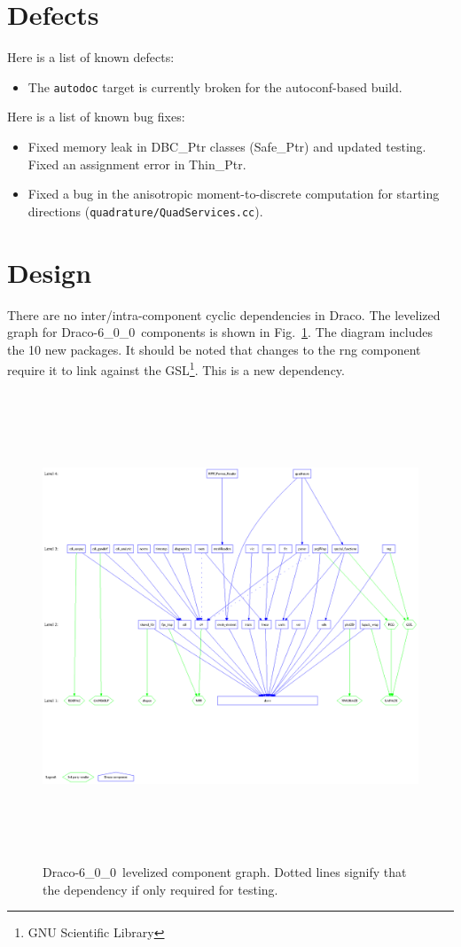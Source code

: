 \documentclass[note]{ResearchNote}
\newcommand{\draco}{Draco}
\newcommand{\dracor}{\draco-6\_0\_0}
\begin{document}
\section{Defects}
Here is a list of known defects:
\begin{itemize}
\item The \texttt{autodoc} target is currently broken for the
  autoconf-based build.
\end{itemize}

\noindent Here is a list of known bug fixes:
\begin{itemize}
\item Fixed memory leak in \textsf{DBC\_Ptr} classes
  (\textsf{Safe\_Ptr}) and updated testing.  Fixed an assignment error
  in \textsf{Thin\_Ptr}.
\item Fixed a bug in the anisotropic moment-to-discrete computation
  for starting directions (\texttt{quadrature/QuadServices.cc}).
\end{itemize}


\section{Design}

There are no inter/intra-component cyclic dependencies in \draco.  The
levelized graph for \dracor\ components is shown in
Fig.~\ref{fig:level}.  The diagram includes the 10 new packages.  It
should be noted that changes to the \textsf{rng} component require it
to link against the \textsf{GSL}\footnote{GNU Scientific Library}.
This is a new dependency.
\begin{figure}
  \label{fig:level}
  \centerline{
    \includegraphics[height=5.5in]{level-6_0_0.ps}}
  \caption{\dracor\ levelized component graph.  Dotted lines signify
    that the dependency if only required for testing.}
\end{figure}
\end{document}

